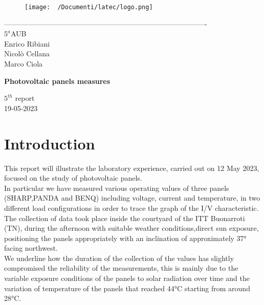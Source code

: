 \documentclass[12pt]{article}
\begin{document}
\begin{titlepage}
	\begin{center}
		\begin{figure}
			\centering
			\texttt{[image: ~/Documenti/latec/logo.png]}
			\label{fig:logo}
		\end{figure}
		-------------------------------------------------------------------------------------\\
		\vspace{2\baselineskip}
		\large $5^a$AUB\\
		\large Enrico Ribiani\\
		\large Nicolò Cellana\\
		\large Marco Ciola\\


		\vfill

		\Huge{\textbf{Photovoltaic panels measures}}\\
		\vfill

		\LARGE{$5^{th}$ report}\\
		\vfill
		\large{19-05-2023}
	\end{center}
\end{titlepage}
\tableofcontents
\newpage
{}
\setcounter{page}{1}
\section{Introduction}
This report will illustrate the laboratory experience, carried out on 12 May 2023, focused on the study of
photovoltaic panels.\\ 
In particular we have measured various operating values of three panels (SHARP,PANDA and BENQ) including 
voltage, current and temperature, in two different load configurations in order to trace the graph of the 
I/V characteristic.\\
The collection of data took place inside the courtyard of the ITT Buonarroti (TN), during the 
afternoon with suitable weather conditions,direct sun exposure, positioning the panels appropriately with an
inclination of approximately 37° facing northwest.\\
We underline how the duration of the collection of the values has slightly compromised the reliability of 
the measurements, this is mainly due to the variable exposure conditions of the panels to solar radiation 
over time and the variation of temperature of the panels that reached 44°C starting from around 28°C.\\
\end{document}
